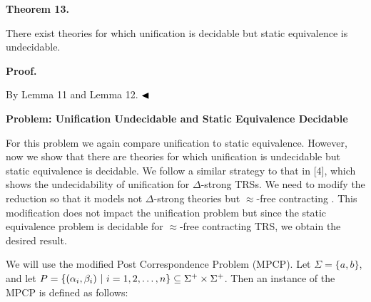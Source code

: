  
 
\par\medskip\noindent\textbf{Theorem 13.}\par
 
 
There exist theories for which unification is decidable but static equivalence is undecidable.\par
 
 
 
 
 
\par\medskip\noindent\textbf{Proof.}\par
 
 
By Lemma 11 and Lemma 12. $\hfill\blacktriangleleft$\par
 
 
 
 
 
\par\medskip\noindent\textbf{Problem: Unification Undecidable and Static Equivalence Decidable}\par
 
 
For this problem we again compare unification to static equivalence. However, now we show that there are theories for which unification is undecidable but static equivalence is decidable. We follow a similar strategy to that in [4], which shows the undecidability of unification for $\Delta$-strong TRSs. We need to modify the reduction so that it models not $\Delta$-strong theories but $\approx$-free contracting . This modification does not impact the unification problem but since the static equivalence problem is decidable for $\approx$-free contracting TRS, we obtain the desired result.\par
 
 
 
We will use the modified Post Correspondence Problem (MPCP). Let $\Sigma=\{a,b\}$, and let $P=\{(\alpha_{i},\beta_{i})\leavevmode\nobreak\ |\leavevmode\nobreak\ i=1,2,%
\ldots,n\}\subseteq\Sigma^{+}\times\Sigma^{+}$. Then an instance of the MPCP is defined as follows:\par
  
